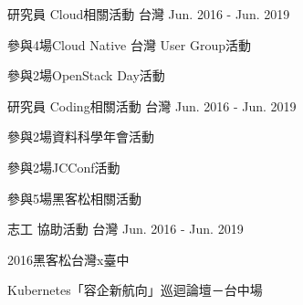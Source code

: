 

\begin{cventries}

  \cventry
    {研究員} %
    {Cloud相關活動} %
    {台灣} %
    {Jun. 2016 - Jun. 2019} %
    {
      \begin{cvitems} %
        \item {參與4場Cloud Native 台灣 User Group活動}
        \item {參與2場OpenStack Day活動}
      \end{cvitems}
    }
    
    \cventry
    {研究員} %
    {Coding相關活動} %
    {台灣} %
    {Jun. 2016 - Jun. 2019} %
    {
      \begin{cvitems} %
        \item {參與2場資料科學年會活動}
        \item {參與2場JCConf活動}
        \item {參與5場黑客松相關活動}
      \end{cvitems}
    }
    
    \cventry
    {志工} %
    {協助活動} %
    {台灣} %
    {Jun. 2016 - Jun. 2019} %
    {
      \begin{cvitems} %
        \item {2016黑客松台灣x臺中}
        \item {Kubernetes「容企新航向」巡迴論壇－台中場}
      \end{cvitems}
    }

\end{cventries}
